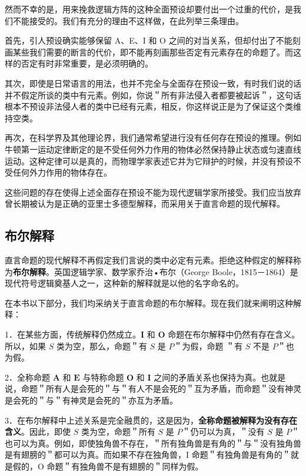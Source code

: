 然而不幸的是，用来挽救逻辑方阵的这种全面预设却要付出一个过重的代价，是我们不能接受的。我们有充分的理由不这样做，在此列举三条理由。

首先，引人预设确实能够保留 A、E、I 和 O 之间的对当关系，但却付出了不能刻画某些我们需要的断言的代价，即不能再刻画那些否定有元素存在的命题了。而这样的否定有时非常重要，是必须明确的。

其次，即使是日常语言的用法，也并不完全与全面存在预设一致，有时我们说的话并不假定所谈的类中有元素。例如，你说＂所有非法侵入者都要被起诉＂，这句话根本不预设非法侵人者的类中已经有元素，相反，你这样说正是为了保证这个类维持空类。

再次，在科学界及其他理论界，我们通常希望进行没有任何存在预设的推理。例如牛顿第一运动定律断定的是不受任何外力作用的物体必然保持静止状态或匀速直线运动。这种定律可以是真的，而物理学家表述它并为它辩护的时候，并没有预设不受任何外力作用的物体存在。

这些问题的存在使得上述全面存在预设不能为现代逻辑学家所接受。我们应当放弃曾长期被认为是正确的亚里士多德型解释，而采用关于直言命题的现代解释。

\subsection{布尔解释}

直言命题的现代解释不再假定我们言说的类中必定有元素。拒绝这种假定的解释称为\textbf{布尔解释}。英国逻辑学家、数学家乔治•布尔（George Boole，1815－1864）是现代符号逻辑奠基人之一，这种新的解释就是以他的名字命名的。\cite{boole1854}

在本书以下部分，我们均采纳关于直言命题的布尔解释。现在我们就来阐明这种解释：

1．在某些方面，传统解释仍然成立。$\mathbf{I}$ 和 $\mathbf{O}$ 命题在布尔解释中仍然有存在含义。所以，如果 $S$ 类为空，那么，命题＂有 $S$ 是 $P$＂为假，命题 ＂有 $S$ 不是 $P$＂也为假。

2．全称命题 $\mathbf{A}$ 和 $\mathbf{E}$ 与特称命题 $\mathbf{O}$ 和 $\mathbf{I}$ 之间的矛盾关系也保持为真。也就是说，命题＂所有人是会死的＂与＂有人不是会死的＂互为矛盾，而命题＂没有神灵是会死的＂与＂有神灵是会死的＂亦互为矛盾。

3．在布尔解释中上述关系是完全融贯的，这是因为，\textbf{全称命题被解释为没有存在含义}。因此，即使 $S$ 类为空，命题＂所有 $S$ 是 $P$＂仍可以为真，＂没有 $S$ 是 $P$＂也可以为真。例如，即使独角兽不存在，＂所有独角兽是有角的＂与＂没有独角兽是有翅膀的＂都可以为真。而如果不存在独角兽，I 命题＂有独角兽是有角的＂就是假的，O 命题＂有独角兽不是有翅膀的＂同样为假。


